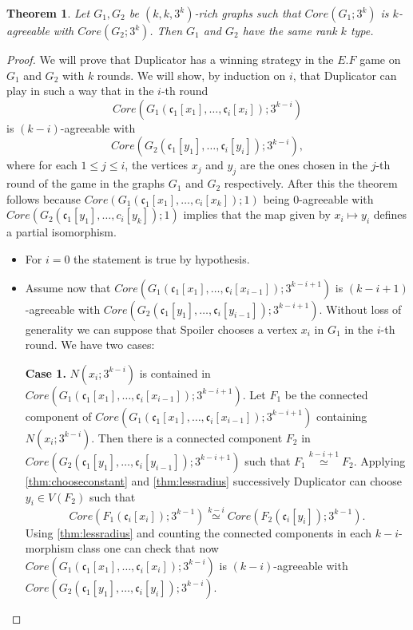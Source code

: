 \documentclass[11pt,notitlepage,a4paper]{article}
\newtheorem{theorem}{Theorem}[section]
\theoremstyle{definition}
\newcommand{\cc}{\mathfrak{c}}
\newcommand{\morph}[1]{\stackrel{#1}{\simeq}}
\begin{document}
\begin{theorem} 
	Let $G_1, G_2$ be $(k,k,3^k)$-rich graphs such that $Core(G_1;3^k)$ is $k$-agreeable
	with $Core(G_2;3^k)$. Then $G_1$ and $G_2$ have the same rank $k$ type.
\end{theorem}
\begin{proof}
	We will prove that Duplicator has a winning strategy in 
	the $E.F$ game on $G_1$ and $G_2$ with $k$ rounds. 
	We will show, by induction on $i$, that Duplicator can play in such a way
	that in the $i$-th round
	\[Core(G_1(\cc_1[x_1],\dots,\cc_i[x_i]);3^{k-i}) \]
	is $(k-i)$-agreeable with  
	\[ Core(G_2(\cc_1[y_1],\dots,\cc_i[y_i]);3^{k-i}), \]
	where for each $1\leq j \leq i$, the vertices
	$x_j$ and $y_j$ are the ones chosen in the $j$-th 
	round of the game in the graphs $G_1$ and $G_2$ respectively. 
	After this the theorem
	follows because
	$Core(G_1(\cc_1[x_1],\dots,c_i[x_k]);1)$ being $0$-agreeable with\\
	$Core(G_2(\cc_1[y_1],\dots,c_i[y_k]);1)$ implies that
	the map given by $x_i\mapsto y_i$ defines a partial isomorphism. \par
	\begin{itemize}[leftmargin=*]
		\item For $i=0$ the statement is true by hypothesis. 
		\item Assume now that $Core(G_1(\cc_1[x_1],\dots,\cc_i[x_{i-1}]);3^{k-i+1})$
		is $(k-i+1)$-agreeable with $Core(G_2(\cc_1[y_1],\dots, \cc_i[y_{i-1}]); 3^{k-i+1})$.
		Without loss of generality we can suppose that Spoiler chooses a vertex 
		$x_i$ in $G_1$ in the $i$-th round. We have two cases: \par
		\textbf{Case 1.} $N(x_i;3^{k-i})$ is contained in 
			$Core(G_1(\cc_1[x_1],\dots,\cc_i[x_{i-1}]);3^{k-i+1})$.
			Let $F_1$ be the connected component of 
			$Core(G_1(\cc_1[x_1],\dots,\cc_i[x_{i-1}]);3^{k-i+1})$
			containing $N(x_i;3^{k-i})$. Then there is a connected component $F_2$
			in \\ 
			$Core(G_2(\cc_1[y_1],\dots,\cc_i[y_{i-1}]);3^{k-i+1})$ such that
			$F_1 \morph{k-i+1} F_2$. Applying \cref{thm:chooseconstant} and 
			\cref{thm:lessradius} successively Duplicator can choose
			$y_i\in V(F_2)$ such that 
			\[ Core(F_1(\cc_i[x_i]); 3^{k-1})\morph{k-i} Core(F_2(\cc_i[y_i]); 3^{k-1}).\]
			Using \cref{thm:lessradius} 
			and counting the connected components in each $k-i$-morphism class
			one can check that now $Core(G_1(\cc_1[x_1],\dots,\cc_i[x_i]);3^{k-i})$
			is $(k-i)$-agreeable with  $Core(G_2(\cc_1[y_1],\dots,\cc_i[y_i]);3^{k-i})$.

\end{itemize}
\end{proof}
\end{document}

